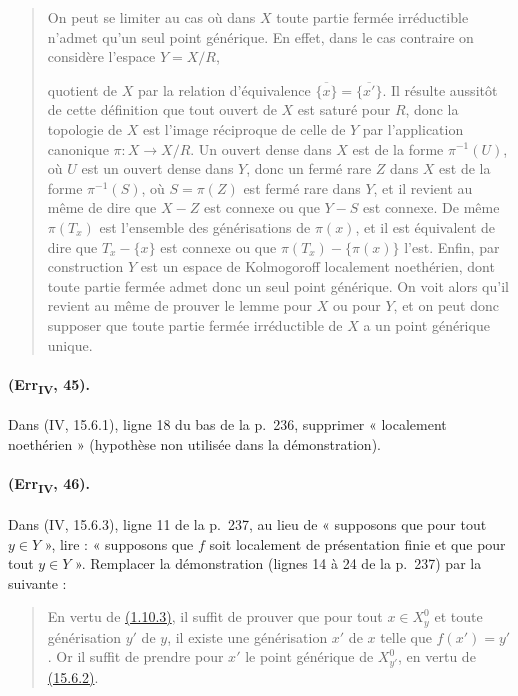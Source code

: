 \begin{quote}
On peut se limiter au cas où dans $X$ toute partie fermée irréductible
n'admet qu'un seul point générique. En effet, dans le cas contraire on
considère l'espace $Y=X/R$,

quotient de $X$ par la relation d'équivalence
$\overline{\{x\}}=\overline{\{x'\}}$. Il résulte aussitôt de cette
définition que tout ouvert de $X$ est saturé pour $R$, donc la topologie
de $X$ est l'image réciproque de celle de $Y$ par l'application
canonique $\pi:X\to X/R$. Un ouvert dense dans $X$ est de la forme
$\pi^{-1}(U)$, où $U$ est un ouvert dense dans $Y$, donc un fermé rare
$Z$ dans $X$ est de la forme $\pi^{-1}(S)$, où $S=\pi(Z)$ est fermé
rare dans $Y$, et il revient au même de dire que $X-Z$ est connexe ou
que $Y-S$ est connexe. De même $\pi(T_x)$ est l'ensemble des
générisations de $\pi(x)$, et il est équivalent de dire que
$T_x-\{x\}$ est connexe ou que $\pi(T_x)-\{\pi(x)\}$ l'est. Enfin, par
construction $Y$ est un espace de Kolmogoroff localement noethérien,
dont toute partie fermée admet donc un seul point générique. On voit
alors qu'il revient au même de prouver le lemme pour $X$ ou pour $Y$,
et on peut donc supposer que toute partie fermée irréductible de $X$ a
un point générique unique.
\end{quote}

\paragraph{(Err\textsubscript{IV}, 45).}
Dans (IV, 15.6.1), ligne 18 du bas de la p.~236, supprimer « localement
noethérien » (hypothèse non utilisée dans la démonstration).

\paragraph{(Err\textsubscript{IV}, 46).}
Dans (IV, 15.6.3), ligne 11 de la p.~237, au lieu de « supposons que
pour tout $y\in Y$ », lire : « supposons que $f$ soit localement de
présentation finie et que pour tout $y\in Y$ ». Remplacer la
démonstration (lignes 14 à 24 de la p.~237) par la suivante :
\begin{quote}
En vertu de {\hyperlink{ega4.c04.prop.1-10-3}{(1.10.3)}}, il suffit de
prouver que pour tout $x\in X_y^0$ et toute générisation $y'$ de $y$,
il existe une générisation $x'$ de $x$ telle que $f(x')=y'$. Or il
suffit de prendre pour $x'$ le point générique de $X_{y'}^0$, en vertu
de {\hyperlink{ega4.c04.cor.15-6-2}{(15.6.2)}}.
\end{quote}

